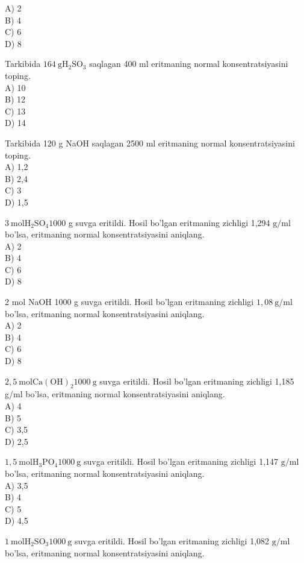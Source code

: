 A) 2\\
B) 4\\
C) 6\\
D) 8
  \item Tarkibida $164 \mathrm{~g} \mathrm{H}_{2} \mathrm{SO}_{3}$ saqlagan 400 ml eritmaning normal konsentratsiyasini toping.\\
A) 10\\
B) 12\\
C) 13\\
D) 14
  \item Tarkibida 120 g NaOH saqlagan 2500 ml eritmaning normal konsentratsiyasini toping.\\
A) 1,2\\
B) 2,4\\
C) 3\\
D) 1,5
  \item $3 \mathrm{~mol} \mathrm{H}_{2} \mathrm{SO}_{4} 1000$ g suvga eritildi. Hosil bo'lgan eritmaning zichligi 1,294 $\mathrm{g} / \mathrm{ml}$ bo'lsa, eritmaning normal konsentratsiyasini aniqlang.\\
A) 2\\
B) 4\\
C) 6\\
D) 8\\
  \item 2 mol NaOH 1000 g suvga eritildi. Hosil bo'lgan eritmaning zichligi $1,08 \mathrm{~g} / \mathrm{ml}$ bo'lsa, eritmaning normal konsentratsiyasini aniqlang.\\
A) 2\\
B) 4\\
C) 6\\
D) 8
  \item $2,5 \mathrm{~mol} \mathrm{Ca}(\mathrm{OH})_{2} 1000 \mathrm{~g}$ suvga eritildi. Hosil bo'lgan eritmaning zichligi 1,185 g/ml bo'lsa, eritmaning normal konsentratsiyasini aniqlang.\\
A) 4\\
B) 5\\
C) 3,5\\
D) 2,5
  \item $1,5 \mathrm{~mol} \mathrm{H}_{3} \mathrm{PO}_{4} 1000 \mathrm{~g}$ suvga eritildi. Hosil bo'lgan eritmaning zichligi 1,147 $\mathrm{g} / \mathrm{ml}$ bo'lsa, eritmaning normal konsentratsiyasini aniqlang.\\
A) 3,5\\
B) 4\\
C) 5\\
D) 4,5
  \item $1 \mathrm{~mol} \mathrm{H}_{2} \mathrm{SO}_{3} 1000 \mathrm{~g}$ suvga eritildi. Hosil bo'lgan eritmaning zichligi 1,082 $\mathrm{g} / \mathrm{ml}$ bo'lsa, eritmaning normal konsentratsiyasini aniqlang.\\
